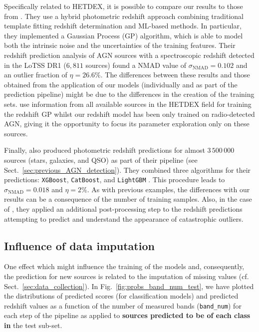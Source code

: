 \documentclass{aa}
\begin{document}
Specifically related to HETDEX, it is possible to compare our results to those from \citet{2019A&A...622A...3D}. They use a hybrid photometric redshift approach combining  traditional template fitting redshift determination and ML-based methods. In particular, they implemented a Gaussian Process (GP) algorithm, which is able to model both the intrinsic noise and the uncertainties of the training features. Their redshift prediction analysis of 
AGN sources with a spectroscopic redshift detected in the LoTSS DR1 ($6,811$ sources) found a NMAD value of ${\sigma_{\mathrm{NMAD}} = 0.102}$ and an outlier fraction of ${\eta = 26.6 \%}$.
The differences between these results and those obtained from the application of our models (individually and as part of the prediction pipeline) might be due to the differences in the creation of the training sets. \citet{2019A&A...622A...3D} use information from all available sources in the HETDEX field for training the redshift GP whilst our redshift model has been only trained on radio-detected AGN, giving it the opportunity to focus its parameter exploration only on these sources.

Finally, \citet{2022A&A...666A..87C} also produced photometric redshift predictions for almost $3\,500\,000$ sources (stars, galaxies, and QSO) as part of their pipeline (see Sect.~\ref{sec:previous_AGN_detection}). They combined three algorithms for their predictions: \texttt{XGBoost}, \texttt{CatBoost}, and \texttt{LightGBM} \citep{NIPS2017_6449f44a}. This procedure leads to ${\sigma_{\mathrm{NMAD}} = 0.018}$ and ${\eta = 2 \%}$. As with previous examples, the differences with our results can be a consequence of the number of training samples. Also, in the case of \citet{2022A&A...666A..87C}, they applied an additional post-processing step to the redshift predictions attempting to predict and understand the appearance of catastrophic outliers.

\subsection{Influence of data imputation}\label{sec:band_num_trends}

One effect which might influence the training of the models and, consequently, the prediction for new sources is related to the imputation of missing values (cf. Sect.~\ref{sec:data_collection}). In Fig.~\ref{fig:probs_band_num_test}, we have plotted the distributions of predicted scores (for classification models) and predicted redshift values as a function of the number of measured bands (\texttt{band\_num}) for each step of the pipeline as applied to \textbf{sources predicted to be of each class in} the test sub-set.
\end{document}
